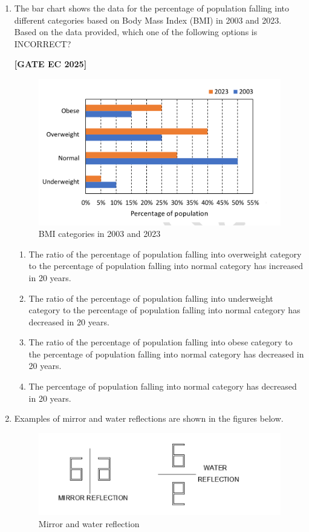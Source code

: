 \documentclass[12pt]{article}
\begin{document}
\begin{enumerate}[leftmargin=1.5em, label=\textbf{Q.\arabic*}., itemsep=2em]
\item The bar chart shows the data for the percentage of population falling into different categories based on Body Mass Index (BMI) in 2003 and 2023.  
Based on the data provided, which one of the following options is INCORRECT?

\noindent \textbf{[GATE EC 2025]}
\begin{figure}[H]\centering
\includegraphics[width=0.7\columnwidth]{figs/q8.png}
\caption{BMI categories in 2003 and 2023}
\label{fig:q8}
\end{figure}
\begin{enumerate}
    \item The ratio of the percentage of population falling into overweight category to the percentage of population falling into normal category has increased in 20 years.
    \item The ratio of the percentage of population falling into underweight category to the percentage of population falling into normal category has decreased in 20 years.
    \item The ratio of the percentage of population falling into obese category to the percentage of population falling into normal category has decreased in 20 years.
    \item The percentage of population falling into normal category has decreased in 20 years.
\end{enumerate}

\item Examples of mirror and water reflections are shown in the figures below.  

\begin{figure}[H]\centering
\includegraphics[width=0.7\columnwidth]{figs/q9a.png}
\caption{Mirror and water reflection}
\label{fig:q9a}
\end{figure}


\end{enumerate}
\end{document}
